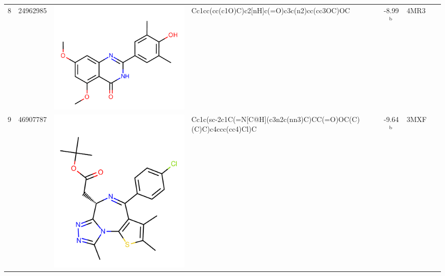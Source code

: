\documentclass[aps,pre,twocolumn,nofootinbib,superscriptaddress,10pt, final,tightenlines]{revtex4-1}
\begin{document}
\begin{table}
\begin{center}
\begin{tabular}{llp{2cm}>{\ttfamily}lS[table-format=-1.2, table-figures-uncertainty=1]ll}
8        & 24962985                                    & \parbox[c]{1em}{\includegraphics[scale=0.15]{figures/new-bromo/RVX-OH.pdf}}   & Cc1cc(cc(c1O)C)c2[nH]c(=O)c3c(n2)cc(cc3OC)OC                     & -8.99$^{\rm b}$                               & 4MR3~\cite{Picaud:2013:PNAS}               & \cite{Picaud:2013:PNAS}                 \\ 
9        & 46907787                               & \parbox[c]{1em}{\includegraphics[scale=0.15]{figures/new-bromo/46907787.pdf}} & Cc1c(sc-2c1C(=N[C@H](c3n2c(nn3)C)CC(=O)OC(C)(C)C)c4ccc(cc4)Cl)C  & -9.64$^{\rm b}$                               & 3MXF~\cite{Filippakopoulos:2010:Nature}    & \cite{Filippakopoulos:2010:Nature}      \\ 

\end{tabular}
\end{center}
\end{table}
\end{document}
